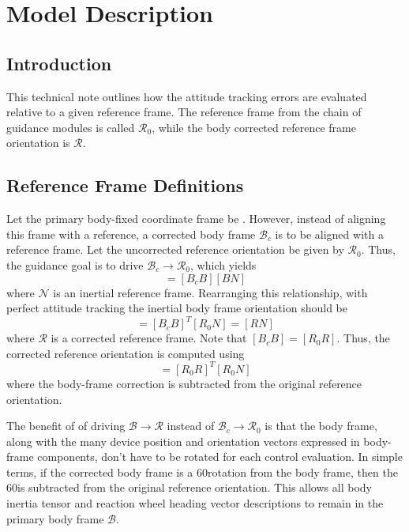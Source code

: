 
\section{Model Description}
\subsection{Introduction}
This technical note outlines how the attitude tracking errors are evaluated relative to a given reference frame. The reference frame from the chain of guidance modules is called $\mathcal{R}_{0}$, while the body corrected reference frame orientation is $\mathcal{R}$.

\subsection{Reference Frame Definitions}
Let the primary body-fixed coordinate frame be . However, instead of aligning this frame with a reference, a corrected body frame $\mathcal{B}_{c}$ is to be aligned with a reference frame.   Let the uncorrected reference orientation be given by $\mathcal{R}_{0}$.  Thus, the guidance goal is to drive $\mathcal{B}_{c} \rightarrow \mathcal{R}_{0}$, which yields
\begin{equation}
	[R_{0} N] = [B_{c} B] [BN]
\end{equation}
where $\mathcal{N}$ is an inertial reference frame.  Rearranging this relationship, with perfect attitude tracking the inertial body frame orientation should be
\begin{equation}
	 [BN] = [B_{c} B]^{T} [R_{0}N]  = [RN]
\end{equation}
where $\mathcal{R}$ is a corrected reference frame.  Note that $[B_{c} B] = [R_{0}R]$.  Thus, the corrected reference orientation is computed using
\begin{equation}
	 [RN] = [R_{0} R]^{T} [R_{0}N]
\end{equation}
where the body-frame correction is subtracted from the original reference orientation.

The benefit of of driving $\mathcal{B} \rightarrow \mathcal{R}$ instead of $\mathcal{B}_{c} \rightarrow \mathcal{R}_{0}$ is that the body frame, along with the many device position and orientation vectors expressed in  body-frame components, don't have to be rotated for each control evaluation.  In simple terms, if the corrected body frame is a 60\dg rotation from the body frame, then the 60\dg is subtracted from the original reference orientation.  This allows all body inertia tensor and reaction wheel heading vector descriptions to remain in the primary body frame $\mathcal{B}$.

